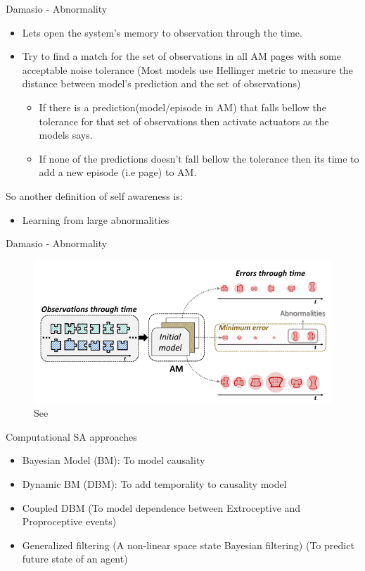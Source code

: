 \documentclass[handout]{beamer}
\begin{document}
\begin{frame}{Damasio - Abnormality}
	\begin{itemize}
		\item Lets open the system's memory to observation through the time.
		\item Try to find a match for the set of observations in all AM pages with some acceptable noise tolerance (Most models use Hellinger metric to measure the distance between model's prediction and the set of observations)
			\begin{itemize}
				\item If there is a prediction(model/episode in AM) that falls bellow the tolerance for that set of observations then activate actuators as the models says. 
				\item If none of the predictions doesn't fall bellow the tolerance then its time to add a new episode (i.e page) to AM.
			\end{itemize} 
	\end{itemize}
	So another definition of self awareness is:
	\begin{itemize}
		\item Learning from large abnormalities
	\end{itemize}	
\end{frame}

\begin{frame}{Damasio - Abnormality}
	\begin{figure}
		\includegraphics[scale=0.3]{regazzoni-2020-multi-sensorial-generative-and-descriptive-self-awareness-models-for-autonomous-systems-fig-8.png}
		\caption{See \cite{regazzoni-2020-multi-sensorial-generative-and-descriptive-self-awareness-models-for-autonomous-systems}}
	\end{figure}
\end{frame}


\begin{frame}{Computational SA approaches}
	\begin{itemize}
		\item Bayesian Model (BM): To model causality 
		\item Dynamic BM (DBM): To add temporality to causality model 
		\item Coupled DBM (To model dependence between Extroceptive and Proproceptive events)
		\item Generalized filtering (A non-linear space state Bayesian filtering) (To predict future state of an agent)
	\end{itemize}
\end{frame}
\end{document}
